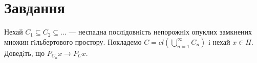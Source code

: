 

\chapter{Завдання \theHchapter}


\begin{tcolorbox}[title=Завдання]
    
    Нехай $C_1 \subseteq C_2 \subseteq ...$ — неспадна послiдовнiсть
    непорожнiх опуклих замкнених множин
    гiльбертового простору. Покладемо 
    $C = cl (\bigcup\limits_{n=1}^{\infty} C_n)$ i нехай $x \in H$. 
    Доведiть, що $P_{C_n} x \rightarrow P_Cx$.
    
\end{tcolorbox}



